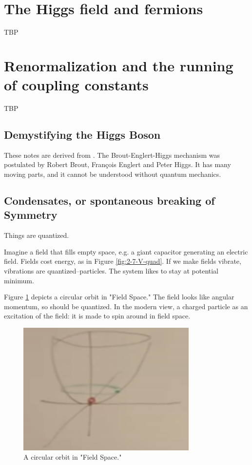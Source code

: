 \documentclass[]{article}
\begin{document}
\section{The Higgs field and fermions}

TBP

\section{Renormalization and the running of coupling constants}

TBP

\begin{appendices}
	\section{Demystifying the Higgs Boson}
	
	These notes are derived from \cite{susskind2010demystifing}.
	The  Brout-Englert-Higgs mechanism was postulated by Robert Brout, Fran\c{c}ois Englert and Peter Higgs. It has many moving parts, and it cannot be understood without quantum mechanics.
	
	\subsection{Condensates, or spontaneous breaking of Symmetry}
	
	Things are quantized.

	Imagine a field that fills empty space, e.g. a giant capacitor generating an electric field. Fields cost energy, as in Figure \ref{fig:2-7-V-quad}. If we make fields vibrate, vibrations are quantized--particles. The system likes to stay at potential minimum.
	
	Figure \ref{fig:2-appendix-field-circle} depicts a circular orbit in "Field Space." The field looks like angular momentum, so should be quantized. In the modern view,  a charged particle as an excitation of the field: it is made to spin around in field space.
	
	\begin{figure}[H]
		\caption{A circular orbit in "Field Space."}\label{fig:2-appendix-field-circle}
		\includegraphics[width=0.8\textwidth]{2-appendix-field-circle}
	\end{figure}
	

\end{appendices}
\end{document}
